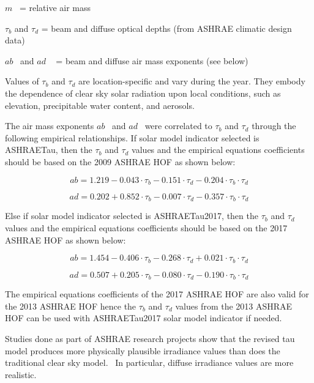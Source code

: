 \emph{\(m\)}~ = relative air mass

$\tau$\(_{b}\) and $\tau$\(_{d}\) = beam and diffuse optical depths (from ASHRAE climatic design data)

\(ab\) ~and \(ad\) ~ = beam and diffuse air mass exponents (see below)

Values of $\tau$\(_{b}\) and $\tau$\(_{d}\) are location-specific and vary during the year. They embody the dependence of clear sky solar radiation upon local conditions, such as elevation, precipitable water content, and aerosols.

The air mass exponents \(ab\) ~and \(ad\) ~were correlated to $\tau$\(_{b}\) and $\tau$\(_{d}\) through the following empirical relationships. If solar model indicator selected is ASHRAETau, then the $\tau$\(_{b}\) and $\tau$\(_{d}\) values and the empirical equations coefficients should be based on the 2009 ASHRAE HOF as shown below:

\begin{equation}
ab = 1.219 - 0.043 \cdot {\tau_b} - 0.151 \cdot {\tau_d} - 0.204 \cdot {\tau_b} \cdot {\tau_d}
\end{equation}

\begin{equation}
ad = 0.202 + 0.852 \cdot {\tau_b} - 0.007 \cdot {\tau_d} - 0.357 \cdot {\tau_b} \cdot {\tau_d}
\end{equation}

Else if solar model indicator selected is ASHRAETau2017, then the $\tau$\(_{b}\) and $\tau$\(_{d}\) values and the empirical equations coefficients should be based on the 2017 ASHRAE HOF as shown below:

\begin{equation}
ab = 1.454 - 0.406 \cdot {\tau_b} - 0.268 \cdot {\tau_d} + 0.021 \cdot {\tau_b} \cdot {\tau_d}
\end{equation}

\begin{equation}
ad = 0.507 + 0.205 \cdot {\tau_b} - 0.080 \cdot {\tau_d} - 0.190 \cdot {\tau_b} \cdot {\tau_d}
\end{equation}

The empirical equations coefficients of the 2017 ASHRAE HOF are also valid for the 2013 ASHRAE HOF hence the $\tau$\(_{b}\) and $\tau$\(_{d}\) values from the 2013 ASHRAE HOF can be used with ASHRAETau2017 solar model indicator if needed.

Studies done as part of ASHRAE research projects show that the revised tau model produces more physically plausible irradiance values than does the traditional clear sky model.~ In particular, diffuse irradiance values are more realistic.

